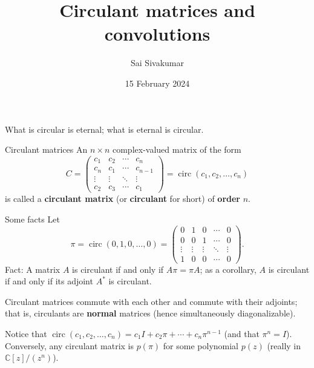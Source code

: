 \documentclass[mathserif
, handout
]{beamer}
\title
{\textcolor{black!85}{Circulant matrices and convolutions}}
\author[Sai Sivakumar]{Sai Sivakumar}
\date{15 February 2024}
\DeclareMathOperator{\Circ}{circ}
\begin{document}
\frame{\titlepage}

\begin{frame}{}
    \begin{center}
        \begin{minipage}{16em}{
            \begin{block}{}
                \centering \Large What is circular is eternal; what is eternal is  circular.
            \end{block}}
        \end{minipage}
    \end{center}
\end{frame}

\begin{frame}{Circulant matrices}
    An $n\times n$ complex-valued matrix of the form \[C = \begin{pmatrix}
        c_1 & c_2 & \cdots & c_n \\
        c_n & c_1 & \cdots & c_{n-1} \\
        \vdots & \vdots & \ddots & \vdots \\
        c_2 & c_3 & \cdots & c_1
    \end{pmatrix} = \Circ(c_1,c_2,\dots,c_n)\] is called a \textbf{circulant matrix} (or \textbf{circulant} for short) of \textbf{order} $n$.
\end{frame}

\begin{frame}{Some facts}
    Let 
    \[\pi = \Circ(0,1,0,\dots,0) = \begin{pmatrix}
        0 & 1 & 0 & \cdots & 0\\
        0 & 0 & 1 & \cdots & 0\\
        \vdots & \vdots & \vdots & \ddots & \vdots\\
        1 & 0 & 0 & \cdots & 0
    \end{pmatrix}.\] Fact: A matrix $A$ is circulant if and only if $A\pi = \pi A$; as a corollary, $A$ is circulant if and only if its adjoint $A^\ast$ is circulant.
\end{frame}

\begin{frame}{}
    Circulant matrices commute with each other and commute with their adjoints; that is, circulants are \textbf{normal} matrices (hence simultaneously diagonalizable).

    Notice that $\Circ(c_1,c_2,\dots,c_n) = c_1 I  + c_2\pi + \cdots + c_n\pi^{n-1}$ (and that $\pi^n = I$). Conversely, any circulant matrix is $p(\pi)$ for some polynomial $p(z)$ (really in $\mathbb C[z]/(z^n)$).
\end{frame}
\end{document}
